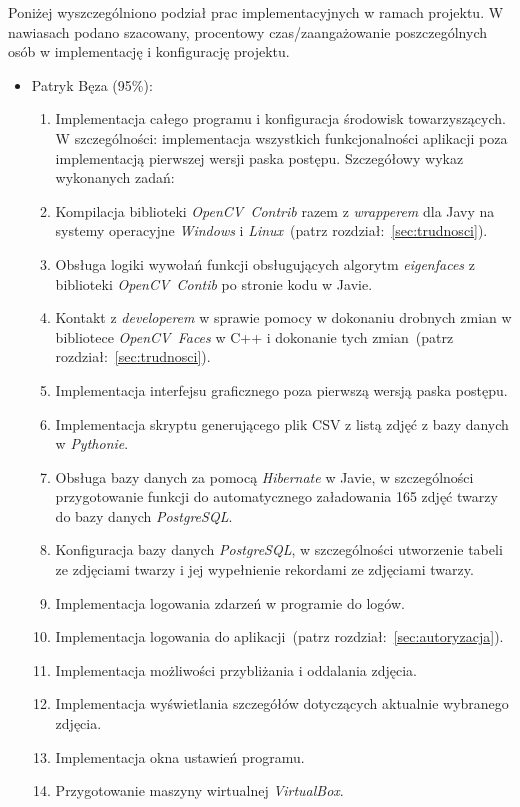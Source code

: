 \documentclass[a4paper,titlepage]{article}
\theoremstyle{break}
\numberwithin{equation}{subsection}
\begin{document}
\begin{appendices}
Poniżej wyszczególniono podział prac implementacyjnych w ramach projektu. W nawiasach podano szacowany, procentowy czas/zaangażowanie poszczególnych osób w implementację i konfigurację projektu.

\begin{itemize}
\item Patryk Bęza (95\%):
	\begin{enumerate}
		\item Implementacja całego programu i konfiguracja środowisk towarzyszących. W szczególności: implementacja wszystkich funkcjonalności aplikacji poza implementacją pierwszej wersji paska postępu. Szczegółowy wykaz wykonanych zadań:
		\item Kompilacja biblioteki \emph{OpenCV~Contrib} razem z \emph{wrapperem} dla Javy na systemy operacyjne \emph{Windows} i \emph{Linux}~(patrz rozdział:~\ref{sec:trudnosci}).
		\item Obsługa logiki wywołań funkcji obsługujących algorytm \emph{eigenfaces} z biblioteki \emph{OpenCV~Contib} po stronie kodu w Javie.
		\item Kontakt z \emph{developerem} w sprawie pomocy w dokonaniu drobnych zmian w bibliotece \emph{OpenCV~Faces} w C++ i dokonanie tych zmian~(patrz rozdział:~\ref{sec:trudnosci}).
		\item Implementacja interfejsu graficznego poza pierwszą wersją paska postępu.
		\item Implementacja skryptu generującego plik CSV z listą zdjęć z bazy danych w \emph{Pythonie}.
		\item Obsługa bazy danych za pomocą \emph{Hibernate} w Javie, w szczególności przygotowanie funkcji do automatycznego załadowania 165 zdjęć twarzy do bazy danych \emph{PostgreSQL}.
		\item Konfiguracja bazy danych \emph{PostgreSQL}, w szczególności utworzenie tabeli ze zdjęciami twarzy i jej wypełnienie rekordami ze zdjęciami twarzy.
		\item Implementacja logowania zdarzeń w programie do logów.
		\item Implementacja logowania do aplikacji~(patrz rozdział:~\ref{sec:autoryzacja}).
		\item Implementacja możliwości przybliżania i oddalania zdjęcia.
		\item Implementacja wyświetlania szczegółów dotyczących aktualnie wybranego zdjęcia.
		\item Implementacja okna ustawień programu.
		\item Przygotowanie maszyny wirtualnej \emph{VirtualBox}.

\end{enumerate}
\end{itemize}
\end{appendices}
\end{document}
